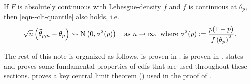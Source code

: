 \begin{corollary}
\label{cor--clt-quantile}
If \(F\) is absolutely continuous with Lebesgue-density \(f\) and \(f\) is
continuous at \(\theta_{p}\), then \eqref{eqn--clt-quantile} also holds,
i.e.
\begin{equation*}
  \sqrt{n} \left( \widehat{\theta}_{p, n} - \theta_{p} \right) \rightsquigarrow
  \mathrm{N} \left( 0, \sigma^{2} (p) \right) \quad \text{as } n \to \infty, \text{
  where } \sigma^{2} (p) := \frac{p (1 - p)}{f \left( \theta_{p} \right)^{2}}.
\end{equation*}
\end{corollary}

The rest of this note is organized as follows.
 is proven in .
 is proven in
.
 states and proves some fundamental properties of cdfs
that are used throughout these sections.
 proves a key central limit theorem
() used in the proof of .


